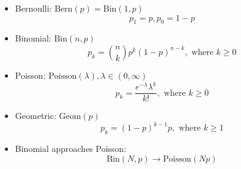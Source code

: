 \begin{itemize}
      \item Bernoulli: $ \text{Bern}(p) = \text{Bin}(1,p)$ \[p_1 = p, p_0 = 1-p\]
      \item Binomial: $\text{Bin}(n,p)$ \[p_k = \binom{n}{k} p^k (1-p)^{n-k}, \text{ where } k \geq 0
            \]
      \item Poisson: $\text{Poisson}(\lambda) , \lambda \in (0,\infty)$ \[p_k = \frac{e^{-\lambda}\lambda^k}{k!}, \text{ where }  k \geq 0 \]
      \item Geometric: $\text{Geom}(p)$ \[p_k = (1-p)^{k-1}p, \text{ where } k\geq 1\]
      \item Binomial approaches Poisson: \[\text{Bin}(N,p) \to \text{Poisson}(Np)\]

\end{itemize}

